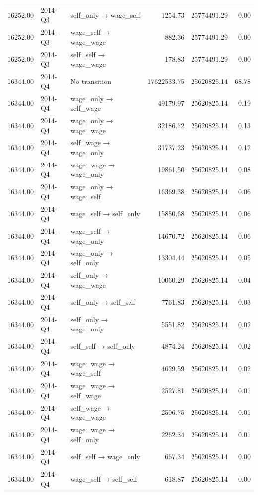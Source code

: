 \begin{table}[ht]
{\begin{tabular}{rllrrr}
  16252.00 & 2014-Q3 & self\_only → wage\_self & 1254.73 & 25774491.29 & 0.00 \\ 
  16252.00 & 2014-Q3 & wage\_self → wage\_wage & 882.36 & 25774491.29 & 0.00 \\ 
  16252.00 & 2014-Q3 & self\_self → wage\_wage & 178.83 & 25774491.29 & 0.00 \\ 
  16344.00 & 2014-Q4 & No transition & 17622533.75 & 25620825.14 & 68.78 \\ 
  16344.00 & 2014-Q4 & wage\_only → self\_wage & 49179.97 & 25620825.14 & 0.19 \\ 
  16344.00 & 2014-Q4 & wage\_only → wage\_wage & 32186.72 & 25620825.14 & 0.13 \\ 
  16344.00 & 2014-Q4 & self\_wage → wage\_only & 31737.23 & 25620825.14 & 0.12 \\ 
  16344.00 & 2014-Q4 & wage\_wage → wage\_only & 19861.50 & 25620825.14 & 0.08 \\ 
  16344.00 & 2014-Q4 & wage\_only → wage\_self & 16369.38 & 25620825.14 & 0.06 \\ 
  16344.00 & 2014-Q4 & wage\_self → self\_only & 15850.68 & 25620825.14 & 0.06 \\ 
  16344.00 & 2014-Q4 & wage\_self → wage\_only & 14670.72 & 25620825.14 & 0.06 \\ 
  16344.00 & 2014-Q4 & wage\_only → self\_only & 13304.44 & 25620825.14 & 0.05 \\ 
  16344.00 & 2014-Q4 & self\_only → wage\_wage & 10060.29 & 25620825.14 & 0.04 \\ 
  16344.00 & 2014-Q4 & self\_only → self\_self & 7761.83 & 25620825.14 & 0.03 \\ 
  16344.00 & 2014-Q4 & self\_only → wage\_only & 5551.82 & 25620825.14 & 0.02 \\ 
  16344.00 & 2014-Q4 & self\_self → self\_only & 4874.24 & 25620825.14 & 0.02 \\ 
  16344.00 & 2014-Q4 & wage\_wage → wage\_self & 4629.59 & 25620825.14 & 0.02 \\ 
  16344.00 & 2014-Q4 & wage\_wage → self\_wage & 2527.81 & 25620825.14 & 0.01 \\ 
  16344.00 & 2014-Q4 & self\_wage → wage\_wage & 2506.75 & 25620825.14 & 0.01 \\ 
  16344.00 & 2014-Q4 & wage\_wage → self\_only & 2262.34 & 25620825.14 & 0.01 \\ 
  16344.00 & 2014-Q4 & self\_self → wage\_only & 667.34 & 25620825.14 & 0.00 \\ 
  16344.00 & 2014-Q4 & wage\_self → self\_self & 618.87 & 25620825.14 & 0.00 \\ 

\end{tabular}}
\end{table}
